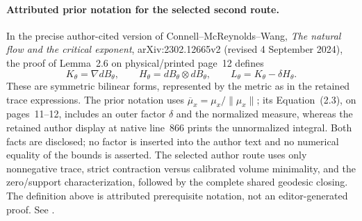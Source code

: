\paragraph{Attributed prior notation for the selected second route.}
In the precise author-cited version of Connell--McReynolds--Wang,
\emph{The natural flow and the critical exponent}, arXiv:2302.12665v2
(revised 4 September 2024), the proof of Lemma~2.6 on physical/printed page~12 defines
\[
 K_\theta=\nabla dB_\theta,\qquad
 H_\theta=dB_\theta\otimes dB_\theta,\qquad
 L_\theta=K_\theta-\delta H_\theta.
\]
These are symmetric bilinear forms, represented by the metric as in the retained
trace expressions. The prior notation uses
$\overline{\mu}_x=\mu_x/\lVert\mu_x\rVert$;
its Equation~(2.3), on pages~11--12, includes an outer factor $\delta$ and the normalized
measure, whereas the retained author display at native line~866 prints the unnormalized
integral. Both facts are disclosed; no factor is inserted into the author text and no
numerical equality of the bounds is asserted. The selected author route uses only
nonnegative trace, strict contraction versus calibrated volume minimality, and the
zero/support characterization, followed by the complete shared geodesic closing.
The definition above is attributed prerequisite notation, not an editor-generated proof.
See \cite[proof of Lemma~2.6 and Equation~(2.3)]{connellNaturalFlowCritical2023}.
